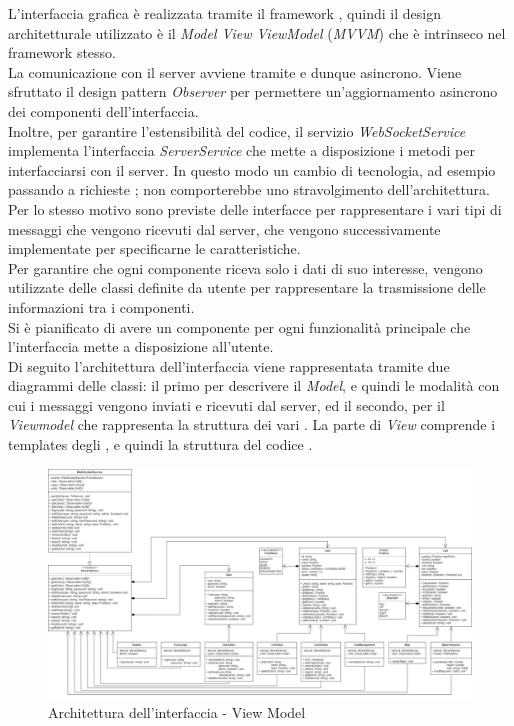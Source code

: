 L'interfaccia grafica è realizzata tramite il framework , quindi il design architetturale utilizzato è il \textit{Model View ViewModel} (\textit{MVVM}) che è intrinseco nel framework stesso. \\
La comunicazione con il server avviene tramite  e dunque asincrono. Viene sfruttato il design pattern \textit{Observer} per permettere un'aggiornamento asincrono dei componenti dell'interfaccia.\\
Inoltre, per garantire l'estensibilità del codice, il servizio \textit{WebSocketService} implementa l'interfaccia \textit{ServerService} che mette a disposizione i metodi per interfacciarsi con il server. In questo modo un cambio di tecnologia, ad esempio passando a richieste ; non comporterebbe uno stravolgimento dell'architettura. \\
Per lo stesso motivo sono previste delle interfacce per rappresentare i vari tipi di messaggi che vengono ricevuti dal server, che vengono successivamente implementate per specificarne le caratteristiche. \\
Per garantire che ogni componente riceva solo i dati di suo interesse, vengono utilizzate delle classi definite da utente per rappresentare la trasmissione delle informazioni tra i componenti. \\
Si è pianificato di avere un componente per ogni funzionalità principale che l'interfaccia mette a disposizione all'utente. \\
\newline
Di seguito l'architettura dell'interfaccia viene rappresentata tramite due diagrammi delle classi: il primo per descrivere il \textit{Model}, e quindi le modalità con cui i messaggi vengono inviati e ricevuti dal server, ed il secondo, per il \textit{Viewmodel} che rappresenta la struttura dei vari . La parte di \textit{View} comprende i templates degli , e quindi la struttura del codice . \\


\newpage

\begin{landscape}
	\begin{figure}[h!]
		\includegraphics[width=24cm]{img/ui_component.png}
		\caption{Architettura dell'interfaccia - View Model}
	\end{figure}
\end{landscape}
\newpage

